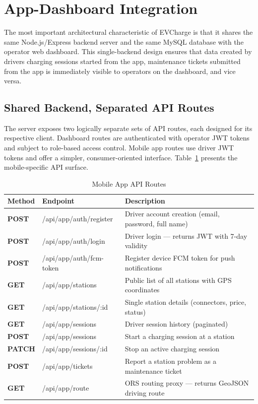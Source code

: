 \documentclass[12pt,a4paper]{report}
\begin{document}
\section{App-Dashboard Integration}

The most important architectural characteristic of EVCharge is that it shares the same
Node.js/Express backend server and the same MySQL database with the operator web dashboard.
This single-backend design ensures that data created by drivers charging sessions started
from the app, maintenance tickets submitted from the app is immediately visible to operators
on the dashboard, and vice versa.

\subsection{Shared Backend, Separated API Routes}

The server exposes two logically separate sets of API routes, each designed for its respective
client. Dashboard routes are authenticated with operator JWT tokens and subject to role-based
access control. Mobile app routes use driver JWT tokens and offer a simpler, consumer-oriented
interface. Table~\ref{tab:mobile-api} presents the mobile-specific API surface.

\begin{table}[h!]
  \centering
  \caption{Mobile App API Routes}
  \label{tab:mobile-api}
  \renewcommand{\arraystretch}{1.3}
  \begin{tabular}{|>{\bfseries}p{1.6cm}|p{5.5cm}|p{6.3cm}|}
    \hline
    Method  & Endpoint                       & Description \\ \hline
    POST    & /api/app/auth/register         & Driver account creation (email, password, full name) \\ \hline
    POST    & /api/app/auth/login            & Driver login --- returns JWT with 7-day validity \\ \hline
    POST    & /api/app/auth/fcm-token        & Register device FCM token for push notifications \\ \hline
    GET     & /api/app/stations              & Public list of all stations with GPS coordinates \\ \hline
    GET     & /api/app/stations/:id          & Single station details (connectors, price, status) \\ \hline
    GET     & /api/app/sessions              & Driver session history (paginated) \\ \hline
    POST    & /api/app/sessions              & Start a charging session at a station \\ \hline
    PATCH   & /api/app/sessions/:id          & Stop an active charging session \\ \hline
    POST    & /api/app/tickets               & Report a station problem as a maintenance ticket \\ \hline
    GET     & /api/app/route                 & ORS routing proxy --- returns GeoJSON driving route \\ \hline
  \end{tabular}
\end{table}
\end{document}
